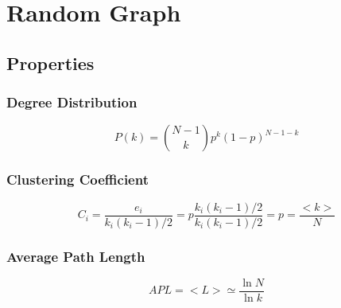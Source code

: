 \documentclass[a4paper,titlepage,11pt]{article}
\begin{document}
\section{Random Graph}
\subsection{Properties}
\subsubsection{Degree Distribution}
\[
  P(k) = {{N-1}\choose{k}} p^{k}(1-p)^{N-1-k}
\]
\subsubsection{Clustering Coefficient}
\[
  C_i = \frac{e_i}{k_i(k_i-1)/2} = p \frac{k_i(k_i-1)/2}{k_i(k_i-1)/2} = p = \frac{<k>}{N} 
\]
\subsubsection{Average Path Length}
\[
  APL = <L> \simeq \frac{\ln{N}}{\ln{k}}
\]
\end{document}
